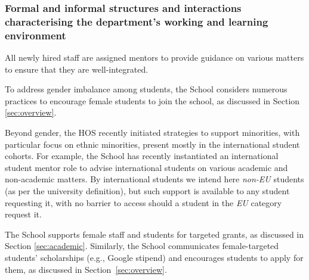 \subsubsection{Formal and informal structures and interactions characterising the department's working and learning environment}

All newly hired staff are assigned mentors to provide guidance on various matters to ensure that they are well-integrated.

To address gender imbalance among students, the School considers numerous practices to encourage female students to join the school, as discussed in Section \ref{sec:overview}.

Beyond gender, the \ac{HOS} recently initiated strategies to support minorities, with particular focus on ethnic minorities, present mostly in the international student cohorts. For example, the School has recently instantiated an international student mentor role to advise international students on various academic and non-academic matters. By international students we intend here \emph{non-EU} students (as per the university definition), but such support is available to any student requesting it, with no barrier to access should a student in the \emph{EU} category request it.


The School supports female staff and students for targeted grants, as discussed in Section \ref{sec:academic}. Similarly, the School communicates female-targeted students' scholarships (e.g., Google stipend) and encourages  students to apply for them, as discussed in Section~\ref{sec:overview}. 





